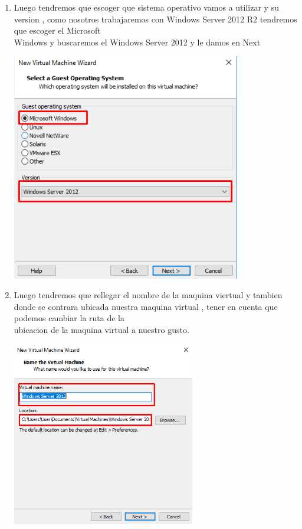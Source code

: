 \begin{enumerate}[1.]
	
	\item Luego tendremos que escoger que sistema operativo vamos a utilizar y su version , como nosotros trabajaremos con Windows Server 2012 R2 tendremos que escoger el Microsoft      		\\Windows y buscaremos el Windows Server 2012 y le damos en Next\\
	\begin{center}
	\includegraphics[width=10cm]{./Imagenes/ang3} 
	\end{center}
	

	\item Luego tendremos que rellegar el nombre de la maquina viertual y tambien donde se contrara ubicada nuestra maquina virtual , tener en cuenta que podemos cambiar la ruta de la       		\\ubicacion de la maquina virtual a nuestro gusto. \\
	\begin{center}
	\includegraphics[width=8cm]{./Imagenes/ang4} 
	\end{center}
	


\end{enumerate}
